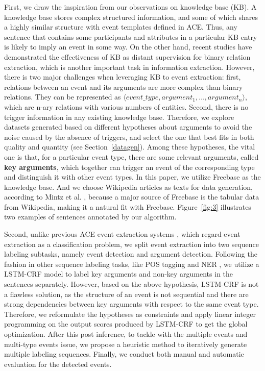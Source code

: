 First, we draw the inspiration from our observations on knowledge base (KB). A knowledge base stores complex structured information, and some of which shares a highly similar structure with event templates defined in ACE. Thus, any sentence that contains some participants and attributes in a particular KB entry is likely to imply an event in some way. On the other hand, recent studies \cite{mintz2009distant,zeng2015distant} have demonstrated the effectiveness of KB as distant supervision for binary relation extraction, which is another important task in information extraction. However, there is two major challenges when leveraging KB to event extraction: first, relations between an event and its arguments are more complex than binary relations. They can be represented as $\langle event\_type, argument_1, \ldots, argument_n\rangle$, which are n-ary relations with various numbers of entities. Second, there is no trigger information in any existing knowledge base. 
Therefore, we explore datasets generated based on different hypotheses about arguments to avoid the noise caused by the absence of triggers, and select the one that best fits in both quality and quantity (see Section~\ref{datagen}). Among these hypotheses, the vital one is that, for a particular event type, there are some relevant arguments, called \textbf{key arguments}, which together can trigger an event of the corresponding type and distinguish it with other event types. In this paper, we utilize Freebase as the knowledge base. And we choose Wikipedia articles as texts for data generation, according to Mintz et al. , because a major source of Freebase is the tabular data from Wikipedia, making it a natural fit with Freebase. Figure~\ref{fig:3} illustrates two examples of sentences annotated by our algorithm.

Second, unlike previous ACE event extraction systems \cite{ahn2006stages,li2013joint,chen2015event,nguyen2016joint}, which regard event extraction as a classification problem, we split event extraction into two sequence labeling subtasks, namely event detection and argument detection. Following the fashion in other sequence labeling tasks, like POS tagging and NER \cite{huang2015bidirectional,lample2016neural}, we utilize a LSTM-CRF model to label key arguments and non-key arguments in the sentences separately. However, based on the above hypothesis, LSTM-CRF is not a flawless solution, as the structure of an event is not sequential and there are strong dependencies between key arguments with respect to the same event type. Therefore, we reformulate the hypotheses as constraints and apply linear integer programming on the output scores produced by LSTM-CRF to get the global optimization. After this post inference, to tackle with the multiple events and multi-type events issue, we propose a heuristic method to iteratively generate multiple labeling sequences. Finally, we conduct both manual and automatic evaluation for the detected events.

